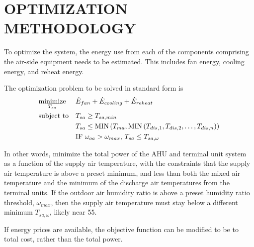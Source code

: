 
%
%
%

\chapter{\texorpdfstring{\MakeUppercase{Optimization Methodology}}{Optimization Methodology}}

To optimize the system, the energy use from each of the components
comprising the air-side equipment needs to be estimated. This includes fan
energy, cooling energy, and reheat energy.

The optimization problem to be solved in standard form is
\begin{equation}
    \begin{aligned}
        & \underset{T_{sa}}{\text{minimize}} & & \dot{E}_{fan} + \dot{E}_{cooling} + \dot{E}_{reheat} \\
        & \text{subject to} & & T_{sa} \geq T_{sa,min} \\
        &&& T_{sa} \leq \text{MIN}\left(T_{ma}, \text{MIN}\left(T_{dis,1}, T_{dis,2}, \ldots, T_{dis,n} \right) \right) \\
        &&& \text{IF } \omega_{oa} > \omega_{max},\,T_{sa} \leq T_{sa,\omega}
    \end{aligned}
\end{equation}

In other words, minimize the total power of the AHU and terminal unit
system as a function of the supply air temperature, with the constraints
that the supply air temperature is above a preset minimum, and less than
both the mixed air temperature and the minimum of the discharge air
temperatures from the terminal units. If the outdoor air humidity ratio
is above a preset humidity ratio threshold, \(\omega_{max}\), then the
supply air temperature must stay below a different minimum
\(T_{sa,\omega}\), likely near \SI{55}{\degF}.

If energy prices are available, the objective function can be modified
to be to total cost, rather than the total power.

